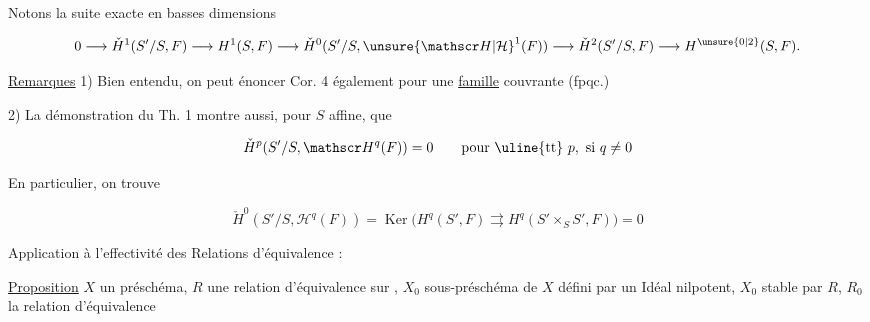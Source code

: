 
Notons  la suite exacte en basses dimensions 

\[
0\longrightarrow\check H^1(S'/S,F)\longrightarrow H^1(S,F)\longrightarrow
\check H^0(S'/S,{\unsure{\mathscr H|\mathcal H}}^1(F))\longrightarrow
\check H^2(S'/S,F)\longrightarrow H^{\unsure{0|2}}(S,F).
\]

\uline{Remarques} 1) Bien entendu, on peut énoncer Cor. 4 également pour une \uline{famille} couvrante (fpqc.)

2) La démonstration du Th. 1 montre aussi, pour $S$ affine, que


\[
\check H^p(S'/S,\mathscr H^q(F))=0 \qquad\text{pour \uline{tt} }p,\ \text{si }q\ne0
\]


En particulier, on trouve

\[
\check H^0(S'/S,\mathscr H^q(F))=\operatorname{Ker}\bigl(H^q(S',F)\rightrightarrows H^q(S'\times_S S',F)\bigr)=0
\]



Application à l'effectivité des Relations d'équivalence :

\uline{Proposition} \quad $X$ un préschéma, $R$ une relation d'équivalence sur , $X_0$ sous-préschéma de $X$ défini par un Idéal nilpotent, $X_0$ stable par $R$, $R_0$ la relation d'équivalence
